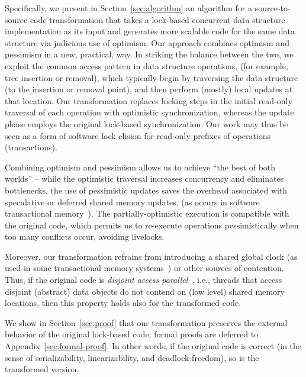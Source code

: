 Specifically, we present in Section~\ref{sec:algorithm} an algorithm for a source-to-source
code transformation that takes a lock-based concurrent data structure implementation as its input
and generates more scalable code for the same data structure via judicious use of optimism.
Our approach combines optimism and pessimism in a new, practical, way.
In striking the balance between the two, we exploit the common access pattern in data structure operations,
(for example, tree insertion or removal), which typically begin by traversing the data structure (to the insertion or removal point), and then perform (mostly) local updates at that location.
Our transformation replaces locking steps in the initial read-only traversal of each operation with
optimistic synchronization, whereas the update phase employs the original lock-based synchronization.
Our work may thus be seen as a form of software lock elision for read-only prefixes of operations (transactions).

Combining optimism and pessimism allows us to achieve ``the best of both worlds'' -- while the
optimistic traversal increases concurrency and eliminates bottlenecks,
the use of pessimistic updates saves the overhead associated with speculative or deferred shared
memory updates, (as occurs in software transactional memory~\cite{HLR:SLCA2010}).
The partially-optimistic execution is compatible with the original code, which permits us to re-execute operations
pessimistically when too many conflicts occur, avoiding livelocks.

Moreover, our transformation
refrains from introducing a shared global clock (as used in some transactional memory systems~\cite{DBLP:conf/eurosys/ShalevS06}) or other sources of contention. 
Thus, if the original code is \emph{disjoint access parallel}~\cite{Israeli:1994:DIS:197917.198079}, i.e., threads
that access disjoint (abstract) data objects do not contend on (low level) shared memory locations, then this
property holds also for the transformed code.

We show in Section~\ref{sec:proof} that our transformation preserves the external behavior of the original lock-based code; formal proofs are deferred to Appendix~\ref{sec:formal-proof}.
In other words, if the original code is correct (in the sense of serializability, linearizability, and deadlock-freedom), so is the
transformed version. 

